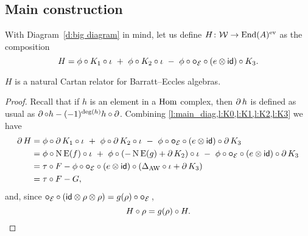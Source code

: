 \subsection{Main construction}

With Diagram~\eqref{d:big diagram} in mind, let us define $H \colon \cW \to \End(A)^\ev$ as the composition
\[
H = \phi \comp K_1 \comp \iota \ +\ \phi \comp K_2 \comp \iota \ -\ \phi \comp \bcomp_{\BE} \comp (e \ot \id) \comp K_3.
\]

\begin{theorem}
	$H$ is a natural Cartan relator for Barratt--Eccles algebras.
\end{theorem}

\begin{proof}
	Recall that if $h$ is an element in a $\Hom$ complex, then $\bd h$ is defined as usual as $\bd \comp h - (-1)^{\deg(h)} h \comp \bd$.
	Combining \cref{l:main_diag,l:K0,l:K1,l:K2,l:K3} we have
	\begin{align*}
		\bd H &=
		\phi \comp \bd K_1 \comp \iota \ +\
		\phi \comp \bd K_2 \comp \iota \ -\
		\phi \comp \bcomp_{\BE} \comp (e \ot \id) \comp \bd K_3 \\ &=
		\phi \comp \chains\EE(f) \comp \iota \ +\
		\phi \comp (-\chains\EE(g) + \bd K_2) \comp \iota \ -\
		\phi \comp \bcomp_{\BE} \comp (e \ot \id) \comp \bd K_3 \\ &=
		\tau \comp F - \phi \comp \bcomp_{\BE} \comp (e \ot \id) \comp (\Delta_{\AW} \comp \iota + \bd K_3) \\ &=
		\tau \comp F - G,
	\end{align*}
	and, since $\bcomp_{\BE} \comp (\id \ot \rho \ot \rho) = g(\rho) \comp \bcomp_{\BE}$\,,
	\[
	H \comp \rho = g(\rho) \comp H. \qedhere
	\]
\end{proof}